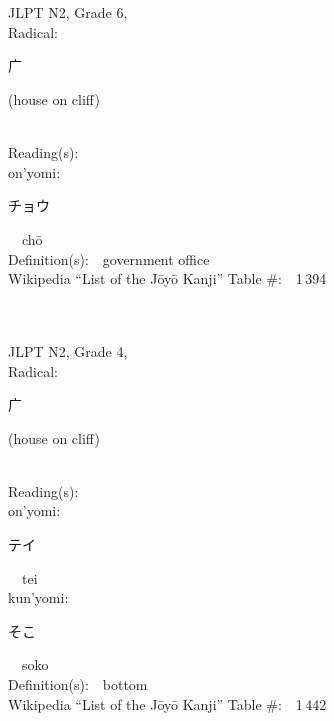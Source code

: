 \begin{multicols}{2}
\ \ \\
{\fontsize{34pt}{40pt}  }\ \ \\  %
{JLPT N2, Grade 6, \\Radical:\ \ {\begin{CJK}{UTF8}{min} 广 \end{CJK}} (house on cliff) } \\
Reading(s):\ \ \\
{\hspace*{1em}}on'yomi:\ \ \\
{\hspace*{2em}}{\begin{CJK}{UTF8}{min} チョウ \end{CJK}}\ \ ch\=o\ \ \\
Definition(s):\ \ government office \\
Wikipedia ``List of the J\=oy\=o Kanji'' Table \#:\ \ 1\,394 \\
\ \ \\
{\fontsize{34pt}{40pt}  }\ \ \\  %
{JLPT N2, Grade 4, \\Radical:\ \ {\begin{CJK}{UTF8}{min} 广 \end{CJK}} (house on cliff) } \\
Reading(s):\ \ \\
{\hspace*{1em}}on'yomi:\ \ \\
{\hspace*{2em}}{\begin{CJK}{UTF8}{min} テイ \end{CJK}}\ \ tei\ \ \\
{\hspace*{1em}}kun'yomi:\ \ \\
{\hspace*{2em}}{\begin{CJK}{UTF8}{min} そこ \end{CJK}}\ \ soko\ \ \\
Definition(s):\ \ bottom \\
Wikipedia ``List of the J\=oy\=o Kanji'' Table \#:\ \ 1\,442 \\

\end{multicols}

